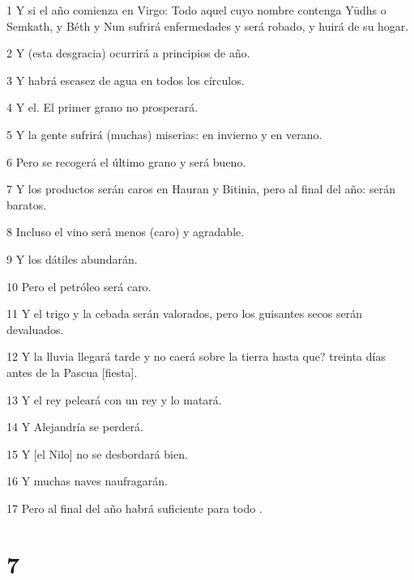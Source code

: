 \par 1 Y si el año comienza en Virgo: Todo aquel cuyo nombre contenga Yūdhs o Semkath, y Béth y Nun sufrirá enfermedades y será robado, y huirá de su hogar.

\par 2 Y (esta desgracia) ocurrirá a principios de año.

\par 3 Y habrá escasez de agua en todos los círculos.

\par 4 Y el. El primer grano no prosperará.

\par 5 Y la gente sufrirá (muchas) miserias: en invierno y en verano.

\par 6 Pero se recogerá el último grano y será bueno.

\par 7 Y los productos serán caros en Hauran y Bitinia, pero al final del año: serán baratos.

\par 8 Incluso el vino será menos (caro) y agradable.

\par 9 Y los dátiles abundarán.

\par 10 Pero el petróleo será caro.

\par 11 Y el trigo y la cebada serán valorados, pero los guisantes secos serán devaluados.

\par 12 Y la lluvia llegará tarde y no caerá sobre la tierra hasta que? treinta días antes de la Pascua [fiesta].

\par 13 Y el rey peleará con un rey y lo matará.

\par 14 Y Alejandría se perderá.

\par 15 Y [el Nilo] no se desbordará bien.

\par 16 Y muchas naves naufragarán.

\par 17 Pero al final del año habrá suficiente para todo .

\chapter{7}

